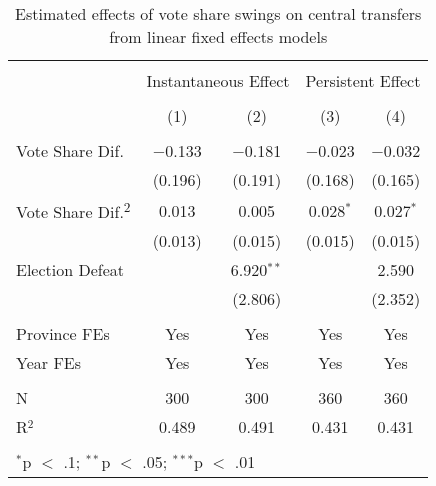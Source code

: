 
\begin{table}[!htbp] \centering 
  \caption{Estimated effects of vote share swings on central transfers from linear fixed effects models} 
  \label{tab:lfe_share} 
\begin{tabular}{@{\extracolsep{5pt}}lcccc} 
\\[-1.8ex]\hline 
\hline \\[-1.8ex] 
 & \multicolumn{2}{c}{Instantaneous Effect} & \multicolumn{2}{c}{Persistent Effect} \\ 
\\[-1.8ex] & (1) & (2) & (3) & (4)\\ 
\hline \\[-1.8ex] 
 Vote Share Dif. & $-$0.133 & $-$0.181 & $-$0.023 & $-$0.032 \\ 
  & (0.196) & (0.191) & (0.168) & (0.165) \\ 
  Vote Share Dif.\textsuperscript{2} & 0.013 & 0.005 & 0.028$^{*}$ & 0.027$^{*}$ \\ 
  & (0.013) & (0.015) & (0.015) & (0.015) \\ 
  Election Defeat &  & 6.920$^{**}$ &  & 2.590 \\ 
  &  & (2.806) &  & (2.352) \\ 
 \hline \\[-1.8ex] 
Province FEs & Yes & Yes & Yes & Yes \\ 
Year FEs & Yes & Yes & Yes & Yes \\ 
\hline \\[-1.8ex] 
N & 300 & 300 & 360 & 360 \\ 
R$^{2}$ & 0.489 & 0.491 & 0.431 & 0.431 \\ 
\hline 
\hline \\[-1.8ex] 
\multicolumn{5}{l}{$^{*}$p $<$ .1; $^{**}$p $<$ .05; $^{***}$p $<$ .01} \\ 
\end{tabular} 
\end{table} 
